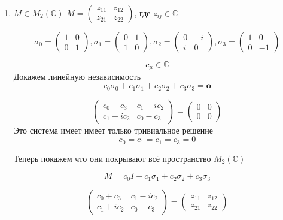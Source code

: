 \begin{solution}
	\begin{enumerate}
	\item 
	$M \in M_{2}(\mathbb{C})$
	$M=\left(\begin{array}{ll}{z_{11}} & {z_{12}} \\ {z_{21}} & {z_{22}}\end{array}\right)$, где $z_{i j} \in \mathbb{C}$
	
	$$
	\sigma_{0}=\left(\begin{array}{ll}{1} & {0} \\ {0} & {1}\end{array}\right), \sigma_{1}=\left(\begin{array}{cc}{0} & {1} \\ {1} & {0}\end{array}\right), \sigma_{2}=\left(\begin{array}{cc}{0} & {-i} \\ {i} & {0}\end{array}\right), \sigma_{3}=\left(\begin{array}{cc}{1} & {0} \\ {0} & {-1}\end{array}\right)
	$$
	
	$$
	c_{\mu} \in \mathbb{C}
	$$
	Докажем линейную независимость
	$$
	c_{0} \sigma_{0}+c_{1} \sigma_{1}+c_{2} \sigma_{2}+c_{3} \sigma_{3}=\mathbf{o}
	$$
	
	$$
	\left(\begin{array}{cc}{c_{0}+c_{3}} & {c_{1}-i c_{2}} \\ {c_{1}+i c_{2}} & {c_{0}-c_{3}}\end{array}\right)=\left(\begin{array}{ll}{0} & {0} \\ {0} & {0}\end{array}\right)
	$$
	Это система имеет имеет только тривиальное решение
	$$
	c_{0}=c_{1}=c_{1}=c_{3}=0
	$$
	
	Теперь покажем что они покрывают всё пространство $	M_{2}(\mathbb{C}) $
	
	$$
	M=c_{0} I+c_{1} \sigma_{1}+c_{2} \sigma_{2}+c_{3} \sigma_{3}
	$$
	
	$$
	\left(\begin{array}{cc}{c_{0}+c_{3}} & {c_{1}-i c_{2}} \\ {c_{1}+i c_{2}} & {c_{0}-c_{3}}\end{array}\right)=\left(\begin{array}{cc}{z_{11}} & {z_{12}} \\ {z_{21}} & {z_{22}}\end{array}\right)
	$$
	

\end{enumerate}
\end{solution}
